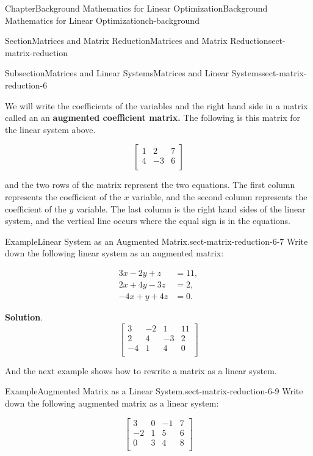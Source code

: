 \documentclass[oneside,10pt,]{book}
\newcommand{\blocktitlefont}{\relax}
\newcommand{\terminology}[1]{\textbf{#1}}
\numberwithin{equation}{section}
\newcommand{\amp}{&}
\begin{document}
\begin{chapterptx}{Chapter}{Background Mathematics for Linear Optimization}{}{Background Mathematics for Linear Optimization}{}{}{ch-background}
\begin{sectionptx}{Section}{Matrices and Matrix Reduction}{}{Matrices and Matrix Reduction}{}{}{sect-matrix-reduction}
\begin{subsectionptx}{Subsection}{Matrices and Linear Systems}{}{Matrices and Linear Systems}{}{}{sect-matrix-reduction-6}
%
\par
We will write the coefficients of the variables and the right hand side in a matrix called an an \terminology{augmented coefficient matrix.} The following is this matrix for the linear system above.%
\par
%
\begin{equation*}
\left[ \begin{array}{rr|r} 1 \amp 2 \amp 7 \\ 4 \amp -3 \amp 6 \\ \end{array} \right]
\end{equation*}
%
\par
and the two rows of the matrix represent the two equations. The first column represents the coefficient of the \(x\) variable, and the second column represents the coefficient of the \(y\) variable. The last column is the right hand sides of the linear system, and the vertical line occurs where the equal sign is in the equations.%
\begin{example}{Example}{Linear System as an Augmented Matrix.}{sect-matrix-reduction-6-7}%
Write down the following linear system as an augmented matrix:%
\par
%
\begin{align*}
3x -2 y + z \amp = 11, \\
2x + 4y -3z \amp = 2, \\
-4x + y + 4z \amp = 0.
\end{align*}
%
\par\smallskip%
\noindent\textbf{\blocktitlefont Solution}.\hypertarget{sect-matrix-reduction-6-7-3}{}\quad{}%
\begin{equation*}
\left[ \begin{array}{rrr|r} 3 \amp -2 \amp 1 \amp 11 \\ 2 \amp 4 \amp -3 \amp 2 \\ -4 \amp 1 \amp 4 \amp 0 \\ \end{array} \right]
\end{equation*}
%
\end{example}
And the next example shows how to rewrite a matrix as a linear system.%
\begin{example}{Example}{Augmented Matrix as a Linear System.}{sect-matrix-reduction-6-9}%
Write down the following augmented matrix as a linear system:%
\par
%
\begin{equation*}
\left[ \begin{array}{rrr|r} 3 \amp 0 \amp -1 \amp 7 \\ -2 \amp 1 \amp 5 \amp 6 \\ 0 \amp 3 \amp 4 \amp 8 \\ \end{array} \right]

\end{equation*}
\end{example}
\end{subsectionptx}
\end{sectionptx}
\end{chapterptx}
\end{document}
